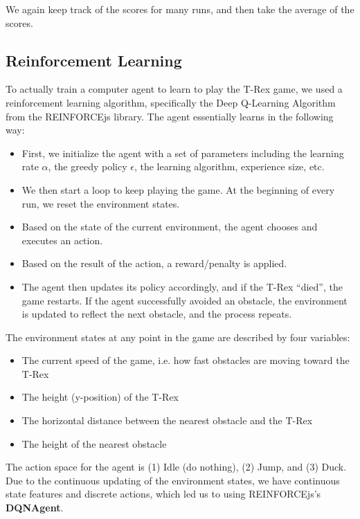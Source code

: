 \documentclass{scrartcl}
\begin{document}
    We again keep track of the scores for many runs, and then take the average of the scores.

    \subsection{Reinforcement Learning}\label{ssec:RL}
    To actually train a computer agent to learn to play the T-Rex game, we used a reinforcement
    learning algorithm, specifically the Deep Q-Learning Algorithm from the REINFORCEjs library.
    The agent essentially learns in the following way:

    \begin{itemize}
        \item First, we initialize the agent with a set of parameters including the learning rate $\alpha$, the greedy policy $\epsilon$, the learning algorithm, experience size, etc.
        \item We then start a loop to keep playing the game. At the beginning of every run, we reset the environment states.
        \item Based on the state of the current environment, the agent chooses and executes an action.
        \item Based on the result of the action, a reward/penalty is applied.
        \item The agent then updates its policy accordingly, and if the T-Rex ``died'', the game restarts. If the agent successfully avoided an obstacle, the environment is updated to reflect the next obstacle, and the process repeats.
    \end{itemize}

    The environment states at any point in the game are described by four variables:
    \begin{itemize}
        \item The current speed of the game, i.e. how fast obstacles are moving toward the T-Rex
        \item The height (y-position) of the T-Rex
        \item The horizontal distance between the nearest obstacle and the T-Rex
        \item The height of the nearest obstacle
    \end{itemize}

    The action space for the agent is (1) Idle (do nothing), (2) Jump, and (3)
    Duck. Due to the continuous updating of the environment states, we have
    continuous state features and discrete actions, which led us to using
    REINFORCEjs's \textbf{DQNAgent}.
\end{document}
